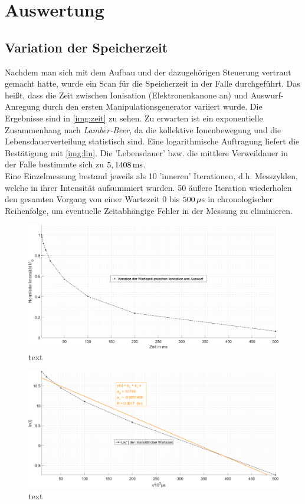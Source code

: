 \documentclass[numbers=noenddot,a4paper,notitlepage,twoside,BCOR15mm]{scrartcl}
\newcommand{\tilt}[1]{\textit{#1}}
\begin{document}
	\newpage
	\section{Auswertung}

		\subsection{Variation der Speicherzeit}

			Nachdem man sich mit dem Aufbau und der dazugehörigen Steuerung vertraut gemacht hatte, wurde ein Scan für die Speicherzeit in der Falle durchgeführt. Das heißt, dass die Zeit zwischen Ionisation (Elektronenkanone an) und Auswurf-Anregung durch den ersten Manipulationsgenerator variiert wurde. Die Ergebnisse sind in \autoref{img:zeit} zu sehen. Zu erwarten ist ein exponentielle Zusammenhang nach \tilt{Lamber-Beer}, da die kollektive Ionenbewegung und die Lebensdauerverteilung statistisch sind. Eine logarithmische Auftragung liefert die Bestätigung mit \autoref{img:lin}. Die 'Lebensdauer' bzw. die mittlere Verweildauer in der Falle bestimmte sich zu $\unit[5,1408]{ms}$.\\
			Eine Einzelmessung bestand jeweils als 10 'inneren' Iterationen, d.h. Messzyklen, welche in ihrer Intensität aufsummiert wurden. 50 äußere Iteration wiederholen den gesamten Vorgang von einer Wartezeit 0 bis $\unit[500]{\mu s}$ in chronologischer Reihenfolge, um eventuelle Zeitabhängige Fehler in der Messung zu eliminieren.

				\begin{figure}[h]
					\includegraphics[width=\textwidth]{wartezeit.png}
					\caption{text}\label{img:zeit}
				\end{figure}

				\begin{figure}[h]
					\includegraphics[width=\textwidth]{linear_fit_wartezeit.png}
					\caption{text}\label{img:lin}
				\end{figure}
\end{document}

